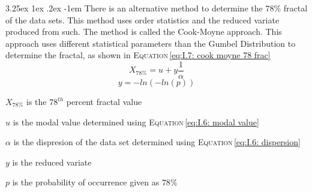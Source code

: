 \documentclass[11pt,a4paper,titlepage]{report}
\makeatletter
\renewcommand\paragraph{\@startsection{paragraph}{5}{\z@}%
  {3.25ex \@plus1ex \@minus.2ex}%
  {-1em}%
  {\normalfont\normalsize\bfseries}}
\makeatother
\begin{document}
\paragraph{}There is an alternative method to determine the $78\%$ fractal of the data sets. This method uses order statistics and the reduced variate produced from such. The method is called the Cook-Moyne approach. This approach uses different statistical parameters than the Gumbel Distribution to determine the fractal, as shown in \textsc{Equation}\,\eqref{eq:I.7: cook moyne 78 frac}
\begin{equation}
    X_{78\%}=u+y\dfrac{1}{\alpha}
    \label{eq:I.7: cook moyne 78 frac}
\end{equation}
\begin{equation}
    y=-ln(-ln(p))
\end{equation}
\begin{itemize}
    \begin{small}
    \item $X_{78\%}$ is the $78^{th}$ percent fractal value
    \item $u$ is the modal value determined using \textsc{Equation}\,\eqref{eq:I.6: modal value}
    \item $\alpha$ is the dispresion of the data set determined using \textsc{Equation}\,\eqref{eq:I.6: dispersion}
    \item $y$ is the reduced variate 
    \item $p$ is the probability of occurrence given as $78\%$
    \end{small}
\end{itemize}
\end{document}

